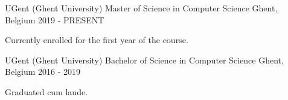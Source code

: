 

\begin{cventries}


  \cventry
    {UGent (Ghent University)} %
    {Master of Science in Computer Science} %
    {Ghent, Belgium} %
    {2019 - PRESENT} %
    {
      \begin{cvitems} %
        \item {Currently enrolled for the first year of the course.}
      \end{cvitems}
    }
    
  \cventry
    {UGent (Ghent University)} %
    {Bachelor of Science in Computer Science} %
    {Ghent, Belgium} %
    {2016 - 2019} %
    {
      \begin{cvitems} %
        \item {Graduated cum laude.}
      \end{cvitems}
    }

\end{cventries}

